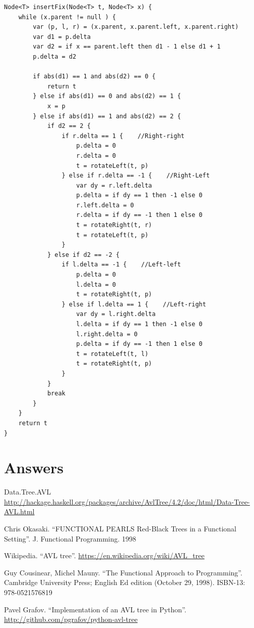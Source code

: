 \documentclass[b5paper]{article}
\begin{document}
\begin{lstlisting}[language = Bourbaki]
Node<T> insertFix(Node<T> t, Node<T> x) {
    while (x.parent != null ) {
        var (p, l, r) = (x.parent, x.parent.left, x.parent.right)
        var d1 = p.delta
        var d2 = if x == parent.left then d1 - 1 else d1 + 1
        p.delta = d2

        if abs(d1) == 1 and abs(d2) == 0 {
            return t
        } else if abs(d1) == 0 and abs(d2) == 1 {
            x = p
        } else if abs(d1) == 1 and abs(d2) == 2 {
            if d2 == 2 {
                if r.delta == 1 {    //Right-right
                    p.delta = 0
                    r.delta = 0
                    t = rotateLeft(t, p)
                } else if r.delta == -1 {    //Right-Left
                    var dy = r.left.delta
                    p.delta = if dy == 1 then -1 else 0
                    r.left.delta = 0
                    r.delta = if dy == -1 then 1 else 0
                    t = rotateRight(t, r)
                    t = rotateLeft(t, p)
                }
            } else if d2 == -2 {
                if l.delta == -1 {    //Left-left
                    p.delta = 0
                    l.delta = 0
                    t = rotateRight(t, p)
                } else if l.delta == 1 {    //Left-right
                    var dy = l.right.delta
                    l.delta = if dy == 1 then -1 else 0
                    l.right.delta = 0
                    p.delta = if dy == -1 then 1 else 0
                    t = rotateLeft(t, l)
                    t = rotateRight(t, p)
                }
            }
            break
        }
    }
    return t
}
\end{lstlisting}

\ifx\wholebook\relax \else
\section{Answers}
\shipoutAnswer

\begin{thebibliography}{99}

Data.Tree.AVL \url{http://hackage.haskell.org/packages/archive/AvlTree/4.2/doc/html/Data-Tree-AVL.html}

Chris Okasaki. ``FUNCTIONAL PEARLS Red-Black Trees in a Functional Setting''. J. Functional Programming. 1998

Wikipedia. ``AVL tree''. \url{https://en.wikipedia.org/wiki/AVL_tree}

Guy Cousinear, Michel Mauny. ``The Functional Approach to Programming''. Cambridge University Press; English Ed edition (October 29, 1998). ISBN-13: 978-0521576819

Pavel Grafov. ``Implementation of an AVL tree in Python''. \url{http://github.com/pgrafov/python-avl-tree}

\end{thebibliography}

\expandafter\enddocument
\fi
\end{document}
